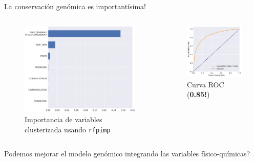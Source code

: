 \documentclass[
  spanish,
  ignorenonframetext,
]{beamer}
\begin{document}
\begin{frame}{La conservación genómica es importantísima!}
\protect\hypertarget{la-conservaciuxf3n-genuxf3mica-es-importantuxedsima}{}

\begin{columns}[T]
\begin{column}{0.48\textwidth}
\begin{figure}
\centering
\includegraphics[width=2.44792in,height=\textheight]{genomic_importance_cluster.pdf}
\caption{Importancia de variables clusterizada usando \texttt{rfpimp}}
\end{figure}
\end{column}

\begin{column}{0.48\textwidth}
\begin{figure}
\centering
\includegraphics[width=1.82292in,height=\textheight]{auc_genomic.pdf}
\caption{Curva ROC (\textbf{0.85!})}
\end{figure}
\end{column}
\end{columns}

\end{frame}

\begin{frame}{}
\protect\hypertarget{section-3}{}

\begin{center}
\Huge Podemos mejorar el modelo genómico integrando las variables físico-químicas?
\end{center}

\end{frame}
\end{document}
